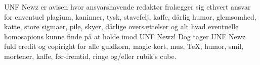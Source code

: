 \begin{minipage}[b]{0.95\linewidth}
\begin{center}
\vspace{3mm}

\tiny UNF Newz er avisen hvor ansvarshavende redaktør fralægger sig ethvert ansvar for enventuel plagium, kaninner, tysk, stavefelj, kaffe, dårlig humor, glemsomhed, katte, store sigmaer, pile, skyer, dårlige oversættelser og alt hvad eventuelle homosapions kunne finde på at holde imod UNF Newz! Dog tager UNF Newz fuld credit og copiright for alle guldkorn, magic kort, mus, TeX, humor, smil, mortener, kaffe, før-fremtid, ringe og/eller rubik's cube.
\end{center}
\end{minipage}

